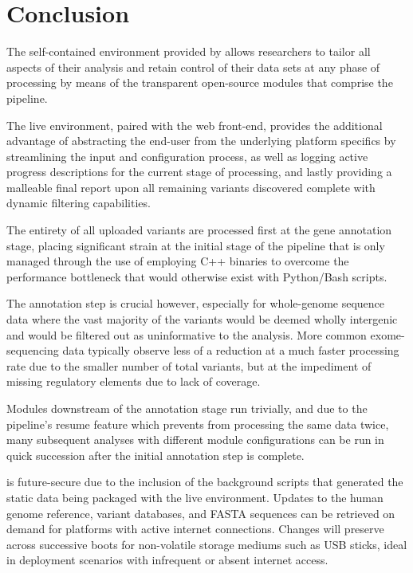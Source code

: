 
\section{Conclusion}

The self-contained environment provided by \app allows researchers to tailor all aspects of their analysis and retain control of their data sets at any phase of processing by means of the transparent open-source modules that comprise the pipeline. 

The live environment, paired with the web front-end, provides the additional advantage of abstracting the end-user from the underlying platform specifics by streamlining the input and configuration process, as well as logging active progress descriptions for the current stage of processing, and lastly providing a malleable final report upon all remaining variants discovered complete with dynamic filtering capabilities.

The entirety of all uploaded variants are processed first at the gene annotation stage, placing significant strain at the initial stage of the pipeline that is only managed through the use of employing C++ binaries to overcome the performance bottleneck that would otherwise exist with Python/Bash scripts.

The annotation step is crucial however, especially for whole-genome sequence data where the vast majority of the variants would be deemed wholly intergenic and would be filtered out as uninformative to the analysis. More common exome-sequencing data typically observe less of a reduction at a much faster processing rate due to the smaller number of total variants, but at the impediment of missing regulatory elements due to lack of coverage.

Modules downstream of the annotation stage run trivially, and due to the pipeline's resume feature which prevents \app from processing the same data twice, many subsequent analyses with different module configurations can be run in quick succession after the initial annotation step is complete.

\app is future-secure due to the inclusion of the background scripts that generated the static data being packaged with the live environment. Updates to the human genome reference, variant databases, and FASTA sequences can be retrieved on demand for platforms with active internet connections. Changes will preserve across successive boots for non-volatile storage mediums such as USB sticks, ideal in deployment scenarios with infrequent or absent internet access.

